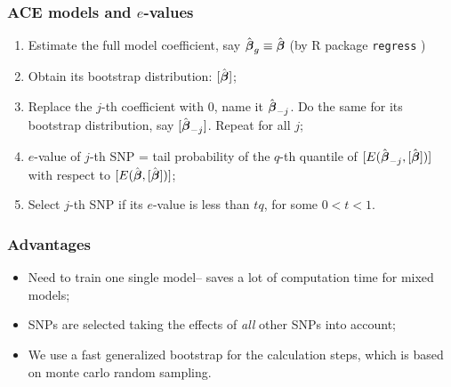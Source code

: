 \documentclass[handout,10pt]{beamer}
\begin{document}
\begin{frame}
\frametitle{ACE models and $e$-values}

\begin{enumerate}
\item Estimate the full model coefficient, say $\hat {{\boldsymbol{\beta}}}_g \equiv \hat {{\boldsymbol{\beta}}}$ (by R package \texttt{regress} )

\item Obtain its bootstrap distribution: $[\hat {{\boldsymbol{\beta}}}]$;

\item Replace the $j$-th coefficient with 0, name it $\hat {{\boldsymbol{\beta}}}_{-j}$. Do the same for its bootstrap distribution, say $[\hat {{\boldsymbol{\beta}}}_{-j}]$. Repeat for all $j$;

\item $e$-value of $j$-th SNP = tail probability of the $q$-th quantile of $[ E (\hat {{\boldsymbol{\beta}}}_{-j}, [ \hat {{\boldsymbol{\beta}}}]) ]$ with respect to $[ E (\hat {{\boldsymbol{\beta}}}, [ \hat {{\boldsymbol{\beta}}}]) ]$;

\item Select $j$-th SNP if its $e$-value is less than $t q$, for some $0<t<1$.
\end{enumerate}

\end{frame}


\begin{frame}
\frametitle{Advantages}

\begin{itemize}
\item Need to train one single model-- saves a lot of computation time for mixed models;
\vspace{1em}

\item SNPs are selected taking the effects of {\it all} other SNPs into account;
\vspace{1em}

\item We use a fast generalized bootstrap \citep{ChatterjeeBose05} for the calculation steps, which is based on monte carlo random sampling.
\end{itemize}

\end{frame}
\end{document}
